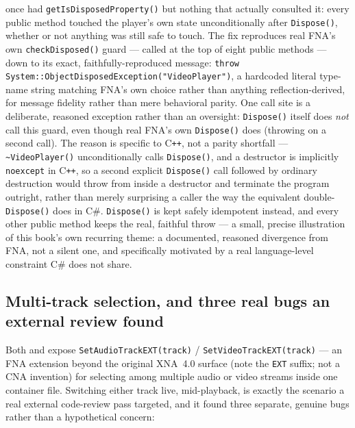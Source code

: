  once had \texttt{getIsDisposedProperty()} but nothing that actually
consulted it: every public method touched the player's own state unconditionally after
\texttt{Dispose()}, whether or not anything was still safe to touch. The fix reproduces real
FNA's own \texttt{checkDisposed()} guard --- called at the top of eight public methods --- down
to its exact, faithfully-reproduced message: \texttt{throw
System::ObjectDisposedException("VideoPlayer")}, a hardcoded literal type-name string matching
FNA's own choice rather than anything reflection-derived, for message fidelity rather than mere
behavioral parity. One call site is a deliberate, reasoned exception rather than an oversight:
\texttt{Dispose()} itself does \emph{not} call this guard, even though real FNA's own
\texttt{Dispose()} does (throwing on a second call). The reason is specific to C\texttt{++}, not
a parity shortfall --- \texttt{\textasciitilde VideoPlayer()} unconditionally calls
\texttt{Dispose()}, and a destructor is implicitly \texttt{noexcept} in C\texttt{++}, so a second
explicit \texttt{Dispose()} call followed by ordinary destruction would throw from inside a
destructor and terminate the program outright, rather than merely surprising a caller the way
the equivalent double-\texttt{Dispose()} does in C\#. \texttt{Dispose()} is kept safely
idempotent instead, and every other public method keeps the real, faithful throw --- a small,
precise illustration of this book's own recurring theme: a documented, reasoned divergence from
FNA, not a silent one, and specifically motivated by a real language-level constraint C\# does
not share.

\subsection{Multi-track selection, and three real bugs an external review found}

Both  and  expose \texttt{SetAudioTrackEXT(track)} /
\texttt{SetVideoTrackEXT(track)} --- an FNA extension beyond the original XNA~4.0 surface (note
the \texttt{EXT} suffix; not a CNA invention) for selecting among multiple audio or video
streams inside one container file. Switching either track live, mid-playback, is exactly the
scenario a real external code-review pass targeted, and it found three separate, genuine bugs
rather than a hypothetical concern:

